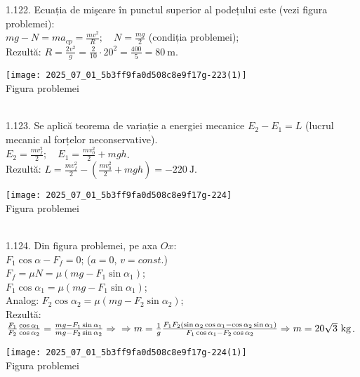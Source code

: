 1.122. Ecuația de mişcare în punctul superior al podețului este (vezi figura problemei):\\ $m g-N=m a_{c p}=\frac{m v^{2}}{R}; \quad N=\frac{m g}{2}$ (condiția problemei);\\ Rezultă: $R=\frac{2 v^{2}}{g}=\frac{2}{10} \cdot 20^{2}=\frac{400}{5}=80 \mathrm{~m}$.\\ \begin{center} \texttt{[image: 2025\_07\_01\_5b3ff9fa0d508c8e9f17g-223(1)]}\\ Figura problemei \end{center}\\

1.123. Se aplică teorema de variație a energiei mecanice $E_{2}-E_{1}=L$ (lucrul mecanic al forțelor neconservative).\\ $E_{2}=\frac{m v_{f}^{2}}{2}; \quad E_{1}=\frac{m v_{0}^{2}}{2}+m g h$.\\ Rezultă: $L=\frac{m v_{f}^{2}}{2}-\left(\frac{m v_{0}^{2}}{2}+m g h\right)=-220 \mathrm{~J}$.\\ \begin{center} \texttt{[image: 2025\_07\_01\_5b3ff9fa0d508c8e9f17g-224]}\\ Figura problemei \end{center}\\

1.124. Din figura problemei, pe axa $Ox$:\\ $F_{1} \cos \alpha-F_{f}=0$; ($a=0$, $v=const.$)\\ $F_{f}=\mu N=\mu\left(m g-F_{1} \sin \alpha_{1}\right)$;\\ $F_{1} \cos \alpha_{1}=\mu\left(m g-F_{1} \sin \alpha_{1}\right)$;\\ Analog: $F_{2} \cos \alpha_{2}=\mu\left(m g-F_{2} \sin \alpha_{2}\right)$;\\ Rezultă: $\frac{F_{1}}{F_{2}} \frac{\cos \alpha_{1}}{\cos \alpha_{2}}=\frac{m g-F_{1} \sin \alpha_{1}}{m g-F_{2} \sin \alpha_{2}} \Rightarrow\\ \Rightarrow m=\frac{1}{g} \frac{F_{1} F_{2}\left(\sin \alpha_{2} \cos \alpha_{1}-\cos \alpha_{2} \sin \alpha_{1}\right)}{F_{1} \cos \alpha_{1}-F_{2} \cos \alpha_{2}} \Rightarrow m=20 \sqrt{3} \mathrm{~kg}$.\\ \begin{center} \texttt{[image: 2025\_07\_01\_5b3ff9fa0d508c8e9f17g-224(1)]}\\ Figura problemei \end{center}\\

